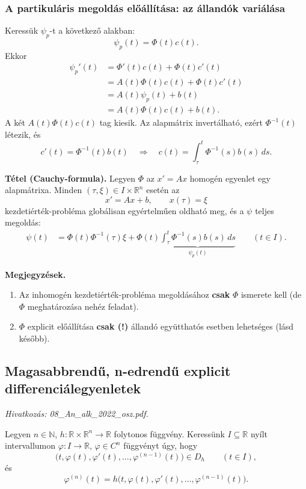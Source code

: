 \subsubsection*{A partikuláris megoldás előállítása: az állandók variálása}
Keressük $\psi_p$-t a következő alakban:
\[
 \psi_p(t)=\Phi(t)c(t).
\]
Ekkor
\begin{align*}
 \psi_p'(t)
 &=\Phi'(t)c(t)+\Phi(t)c'(t)\\
 &=A(t)\Phi(t)c(t)+\Phi(t)c'(t)\\
 &=A(t)\psi_p(t)+b(t)\\
 &=A(t)\Phi(t)c(t)+b(t).
\end{align*}
A két $A(t)\Phi(t)c(t)$ tag kiesik. Az alapmátrix invertálható,
ezért $\Phi^{-1}(t)$ létezik, és
\[
 c'(t)=\Phi^{-1}(t)b(t)
 \quad\Longrightarrow\quad
 c(t)=\int_\tau^t\Phi^{-1}(s)b(s)\,ds.
\]

\begin{matbox}
\textbf{Tétel (Cauchy-formula).} Legyen $\Phi$ az $x'=Ax$
homogén egyenlet egy alapmátrixa. Minden
$(\tau,\xi)\in I\times\mathbb R^n$ esetén az
\[
 x'=Ax+b,\qquad x(\tau)=\xi
\]
kezdetiérték-probléma globálisan egyértelműen oldható meg,
és a $\psi$ teljes megoldás:
\begin{align*}
 \psi(t)&=\Phi(t)\Phi^{-1}(\tau)\xi
 +\Phi(t)\underbrace{\int_\tau^t
             \Phi^{-1}(s)b(s)\,ds}_{\psi_p(t)}
 \qquad(t\in I).
\end{align*}
\end{matbox}

\textbf{Megjegyzések.}
\begin{enumerate}[label=\arabic*)]
\item Az inhomogén kezdetiérték-probléma megoldásához
\textbf{csak} $\Phi$ ismerete kell (de $\Phi$ meghatározása nehéz feladat).
\item $\Phi$ explicit előállítása \textbf{csak (!)}
állandó együtthatós esetben lehetséges (lásd később).
\end{enumerate}

\subsection{Magasabbrendű, n-edrendű explicit differenciálegyenletek}
\textit{Hivatkozás: 08\_An\_alk\_2022\_osz.pdf.}

Legyen $n\in\mathbb N$, $h:\mathbb R\times\mathbb R^n\to\mathbb R$
folytonos függvény. Keressünk $I\subseteq\mathbb R$ nyílt intervallumon
$\varphi:I\to\mathbb R$, $\varphi\in C^n$ függvényt úgy, hogy
\[
 \bigl(t,\varphi(t),\varphi'(t),\ldots,
              \varphi^{(n-1)}(t)\bigr)\in D_h
 \qquad(t\in I),
\]
és
\[
 \varphi^{(n)}(t)
 =h\bigl(t,\varphi(t),\varphi'(t),\ldots,
                    \varphi^{(n-1)}(t)\bigr).
\]

